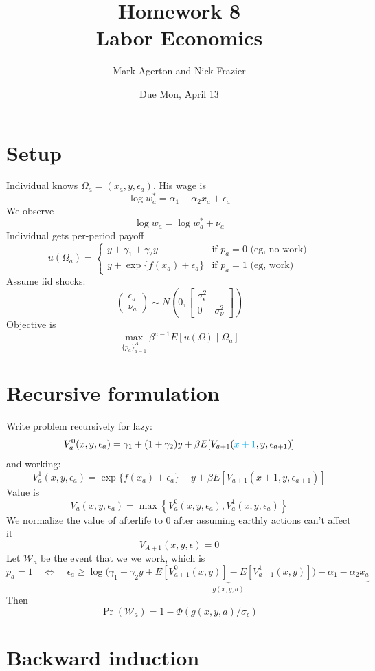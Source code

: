 \documentclass[11pt,letterpaper]{article}
\title{\textbf{Homework 8} \\ Labor Economics}
\author{Mark Agerton and {\color{cyan} Nick Frazier} }
\date{Due Mon, April 13}
\begin{document}
\maketitle

\section{Setup}
Individual knows $\Omega_a = (x_a, y, \epsilon_a)$. His wage is 
\[
    \log w_a^* = \alpha_1 + \alpha_2 x_a + \epsilon_a
\]
We observe
\[
    \log w_a = \log w_a^* + \nu_a
\]
Individual gets per-period payoff
\[
u(\Omega_a) = 
\begin{cases}
    y + \gamma_1 + \gamma_2y         & \text{if } p_a = 0  \text{ (eg, no work)} \\
    y + \exp\{f(x_a) + \epsilon_a\}  & \text{if } p_a = 1  \text{ (eg, work)} 
\end{cases}
\]
Assume iid shocks:
\[
\begin{pmatrix}
\epsilon_a \\ \nu_a
\end{pmatrix}
\sim 
N\left(
0,
\begin{bmatrix}
\sigma_\epsilon^2  & \\
0 & \sigma^2_\nu
\end{bmatrix}
\right)
\]
Objective is
\[
\max_{\{p_a\}_{a=1}^A} \beta^{a-1} E\left[ u(\Omega) \middle| \Omega_a \right]
\]

\section{Recursive formulation}

Write problem recursively for lazy:
\[
V_a^0(x,y,\epsilon_a) = \gamma_1 + (1+\gamma_2)y + \beta E[V_{a+1}( {\color{cyan} x+1},y,\epsilon_{a+1})]
\]
and working:
\[
V_a^1(x,y,\epsilon_a) =
\exp\{f(x_a) + \epsilon_a\} + y + \beta E[V_{a+1}(x+1,y, \epsilon_{a+1})]
\]
Value is
\[
V_a(x,y,\epsilon_a) = \max\left\{V_a^0(x,y,\epsilon_a), V_a^1(x,y,\epsilon_a)\right\}
\]
We normalize the value of afterlife to 0 after assuming earthly actions can't affect it
\[
    V_{A+1}(x,y,\epsilon) = 0
\]
Let $\mathcal W_a$ be the event that we we work, which is 
\[
p_a = 1 \quad \Leftrightarrow \quad
\epsilon_a \geq \underbrace{ \log \bigg( \gamma_1 + \gamma_2 y + E[V_{a+1}^0(x,y)] - E[V_{a+1}^1(x,y)] \bigg) - \alpha_1 - \alpha_2 x_a }_{g(x,y,a)}
\]
Then 
\[
\Pr(\mathcal W_a) = 1- \Phi(g(x,y,a)/\sigma_\epsilon)
\]

\section{Backward induction}
\end{document}
